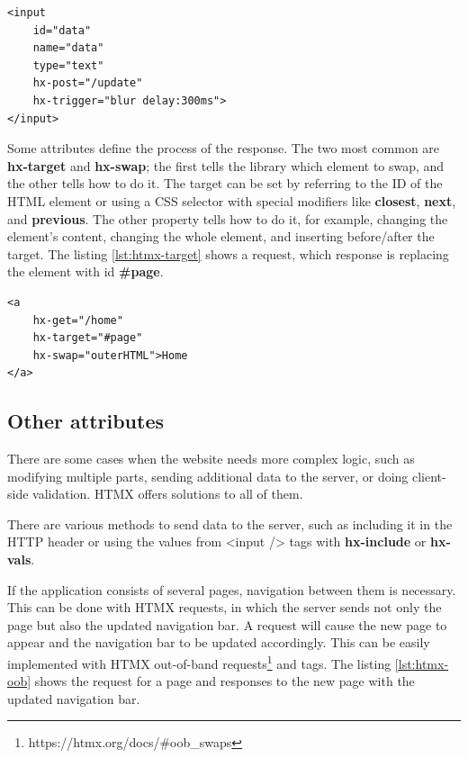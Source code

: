 \begin{lstlisting}[caption=Custom HTMX trigger,label=lst:htmx-trigger, float]
<input 
	id="data"
	name="data"
	type="text"
	hx-post="/update"
	hx-trigger="blur delay:300ms">
</input>
\end{lstlisting}

Some attributes define the process of the response. The two most common are \textbf{hx-target} and \textbf{hx-swap}; the first tells the library which element to swap, and the other tells how to do it. The target can be set by referring to the ID of the HTML element or using a CSS selector with special modifiers like \textbf{closest}, \textbf{next}, and \textbf{previous}. The other property tells how to do it, for example, changing the element's content, changing the whole element, and inserting before/after the target. The listing \ref{lst:htmx-target} shows a request, which response is replacing the element with id \textbf{\#page}.

\begin{lstlisting}[caption=Setting HTMX target,label=lst:htmx-target, float]
<a 
	hx-get="/home"
	hx-target="#page"
	hx-swap="outerHTML">Home
</a>
\end{lstlisting}

\subsection{Other attributes}
There are some cases when the website needs more complex logic, such as modifying multiple parts, sending additional data to the server, or doing client-side validation. HTMX offers solutions to all of them.

There are various methods to send data to the server, such as including it in the HTTP header or using the values from <input /> tags with \textbf{hx-include} or \textbf{hx-vals}.

If the application consists of several pages, navigation between them is necessary. This can be done with HTMX requests, in which the server sends not only the page but also the updated navigation bar. A request will cause the new page to appear and the navigation bar to be updated accordingly. This can be easily implemented with HTMX out-of-band requests\footnote{https://htmx.org/docs/#oob_swaps} and tags. The listing \ref{lst:htmx-oob} shows the request for a page and responses to the new page with the updated navigation bar.

